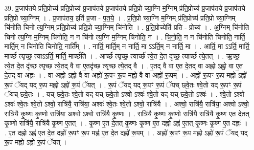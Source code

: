 \documentclass[17pt]{extarticle}
\begin{document}
39. प्र॒जाप॑तये प्रति॒प्रोच्य॑ प्रति॒प्रोच्य॑ प्र॒जाप॑तये प्र॒जाप॑तये प्रति॒प्रो च्या॒ग्नि म॒ग्निम् प्र॑ति॒प्रोच्य॑ प्र॒जाप॑तये प्र॒जाप॑तये प्रति॒प्रो च्या॒ग्निम् । . प्र॒जाप॑तय॒ इति॑ प्र॒जा - प॒त॒ये॒ । . प्र॒ति॒प्रो च्या॒ग्नि म॒ग्निम् प्र॑ति॒प्रोच्य॑ प्रति॒प्रो च्या॒ग्निम् चि॑नोति चिनो त्य॒ग्निम् प्र॑ति॒प्रोच्य॑ प्रति॒प्रो च्या॒ग्निम् चि॑नोति । . प्र॒ति॒प्रोच्येति॑ प्रति - प्रोच्य॑ । . अ॒ग्निम् चि॑नोति चिनो त्य॒ग्नि म॒ग्निम् चि॑नोति॒ न न चि॑नो त्य॒ग्नि म॒ग्निम् चि॑नोति॒ न । . चि॒नो॒ति॒ न न चि॑नोति चिनोति॒ नार्ति॒ मार्ति॒म् न चि॑नोति चिनोति॒ नार्ति᳚म् । . नार्ति॒ मार्ति॒म् न नार्ति॒ मा ऽऽर्ति॒म् न नार्ति॒ मा । . आर्ति॒ मा ऽऽर्ति॒ मार्ति॒ मार्च्छ॑ त्यृच्छ॒ त्याऽऽर्ति॒ मार्ति॒ मार्च्छ॑ति । . आर्च्छ॑ त्यृच्छ॒ त्यार्च्छ॑ त्ये॒त दे॒त दृ॑च्छ॒ त्यार्च्छ॑ त्ये॒तत् । . ऋ॒च्छ॒ त्ये॒त दे॒त दृ॑च्छ त्यृच्छ त्ये॒तद् वै वा ए॒तदृ॑च्छ त्यृच्छ त्ये॒तद् वै । . ए॒तद् वै वा ए॒त दे॒तद् वा अह्नो ऽह्नो॒ वा ए॒त दे॒तद् वा अह्नः॑ । . वा अह्नो ऽह्नो॒ वै वा अह्नो॑ रू॒पꣳ रू॒प मह्नो॒ वै वा अह्नो॑ रू॒पम् । . अह्नो॑ रू॒पꣳ रू॒प मह्नो ऽह्नो॑ रू॒पं ॅयद् यद् रू॒प मह्नो ऽह्नो॑ रू॒पं ॅयत् । . रू॒पं ॅयद् यद् रू॒पꣳ रू॒पं ॅयच् छ्वे॒तः श्वे॒तो यद् रू॒पꣳ रू॒पं ॅयच् छ्वे॒तः । . यच् छ्वे॒तः श्वे॒तो यद् यच् छ्वे॒तो ऽश्वो ऽश्वः॑ श्वे॒तो यद् यच् छ्वे॒तो ऽश्वः॑ । . श्वे॒तो ऽश्वो ऽश्वः॑ श्वे॒तः श्वे॒तो ऽश्वो॒ रात्रि॑यै॒ रात्रि॑या॒ अश्वः॑ श्वे॒तः श्वे॒तो ऽश्वो॒ रात्रि॑यै । . अश्वो॒ रात्रि॑यै॒ रात्रि॑या॒ अश्वो ऽश्वो॒ रात्रि॑यै कृ॒ष्णः कृ॒ष्णो रात्रि॑या॒ अश्वो ऽश्वो॒ रात्रि॑यै कृ॒ष्णः । . रात्रि॑यै कृ॒ष्णः कृ॒ष्णो रात्रि॑यै॒ रात्रि॑यै कृ॒ष्ण ए॒त दे॒तत् कृ॒ष्णो रात्रि॑यै॒ रात्रि॑यै कृ॒ष्ण ए॒तत् । . कृ॒ष्ण ए॒त दे॒तत् कृ॒ष्णः कृ॒ष्ण ए॒त दह्नो ऽह्न॑ ए॒तत् कृ॒ष्णः कृ॒ष्ण ए॒त दह्नः॑ । . ए॒त दह्नो ऽह्न॑ ए॒त दे॒त दह्नो॑ रू॒पꣳ रू॒प मह्न॑ ए॒त दे॒त दह्नो॑ रू॒पम् । . अह्नो॑ रू॒पꣳ रू॒प मह्नो ऽह्नो॑ रू॒पं ॅयद् यद् रू॒प मह्नो ऽह्नो॑ रू॒पं ॅयत् । \newline
\pagebreak
{}
\end{document}
